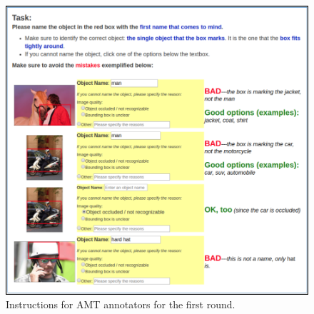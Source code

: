 \documentclass[11pt,a4paper]{article}
\begin{document}
\begin{figure}[htp]
  \centering
  \includegraphics[width=1.5\columnwidth]{figures/round0.png}
  \caption{Instructions for AMT annotators for the first round.}
  \label{fig:instructions1}
\end{figure}
\end{document}
